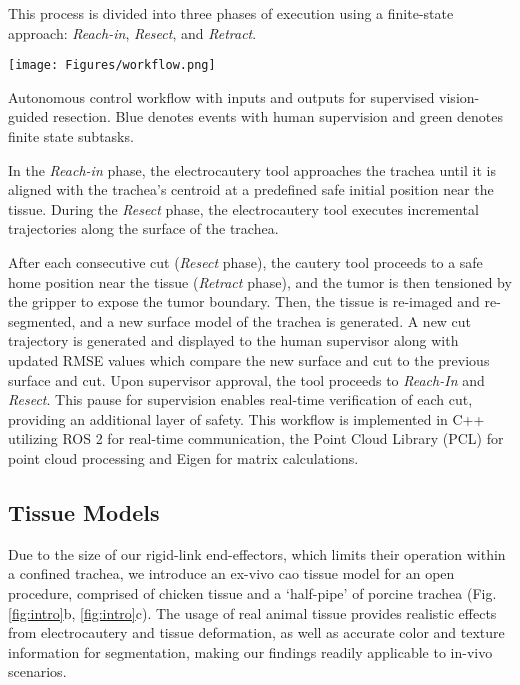 This process is divided into three phases of execution using a finite-state approach: \textit{Reach-in}, \textit{Resect}, and \textit{Retract}. 

\vspace{1em}
\begin{figurehere}
    \centering
    \texttt{[image: Figures/workflow.png]}
    \caption{Autonomous control workflow with inputs and outputs for supervised vision-guided resection. Blue denotes events with human supervision and green denotes finite state subtasks.}
    \label{fig:workflow}
\end{figurehere}

\noindent In the \textit{Reach-in} phase, the electrocautery tool approaches the trachea until it is aligned with the trachea's centroid at a predefined safe initial position near the tissue. During the \textit{Resect} phase, the electrocautery tool executes incremental trajectories along the surface of the trachea. 

After each consecutive cut (\textit{Resect} phase), the cautery tool proceeds to a safe home position near the tissue (\textit{Retract} phase), and the tumor is then tensioned by the gripper to expose the tumor boundary. Then, the tissue is re-imaged and re-segmented, and a new surface model of the trachea is generated. A new cut trajectory is generated and displayed to the human supervisor along with updated RMSE values which compare the new surface and cut to the previous surface and cut. Upon supervisor approval, the tool proceeds to \textit{Reach-In} and \textit{Resect}. This pause for supervision enables real-time verification of each cut, providing an additional layer of safety. This workflow is implemented in C++ utilizing ROS 2 for real-time communication, the Point Cloud Library (PCL) for point cloud processing and Eigen for matrix calculations. 

\subsection{Tissue Models}

Due to the size of our rigid-link end-effectors, which limits their operation within a confined trachea, we introduce an ex-vivo \gls{cao} tissue model for an open procedure, comprised of chicken tissue and a `half-pipe' of porcine trachea (Fig. \ref{fig:intro}b, \ref{fig:intro}c). The usage of real animal tissue provides realistic effects from electrocautery and tissue deformation, as well as accurate color and texture information for segmentation, making our findings readily applicable to in-vivo scenarios.






